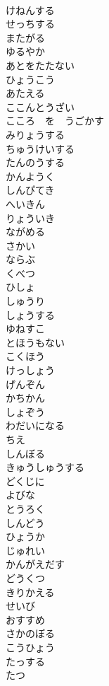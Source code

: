 \documentclass[8pt]{extreport}
\begin{document}
\begin{CJK}{UTF8}{min}
\\	けねんする
\\	せっちする
\\	またがる
\\	ゆるやか
\\	あとをたたない
\\	ひょうこう
\\	あたえる
\\	ここんとうざい
\\	こころ　を　うごかす
\\	みりょうする
\\	ちゅうけいする
\\	たんのうする
\\	かんようく
\\	しんぴてき
\\	へいきん
\\	りょういき
\\	ながめる
\\	さかい
\\	ならぶ
\\	くべつ
\\	ひしょ
\\	しゅうり
\\	しょうする
\\	ゆねすこ
\\	とほうもない
\\	こくほう
\\	けっしょう
\\	げんぞん
\\	かちかん
\\	しょぞう
\\	わだいになる
\\	ちえ
\\	しんぼる
\\	きゅうしゅうする
\\	どくじに
\\	よびな
\\	とうろく
\\	しんどう
\\	ひょうか
\\	じゅれい
\\	かんがえだす
\\	どうくつ
\\	きりかえる
\\	せいび
\\	おすすめ
\\	さかのぼる
\\	こうひょう
\\	たっする
\\	たつ

\end{CJK}
\end{document}
